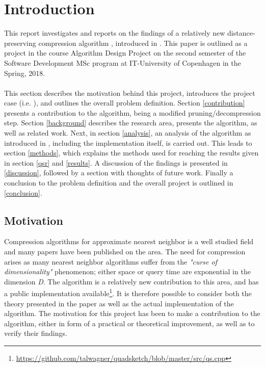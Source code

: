 \section{Introduction}
\label{introduction}
This report investigates and reports on the findings of a relatively new distance-preserving compression algorithm \qs{}, introduced in \cite{wagner17}. This paper is outlined as a project in the course Algorithm Design Project on the second semester of the Software Development MSc program at IT-University of Copenhagen in the Spring, 2018.
\\
\\
This section describes the motivation behind this project, introduces the project case (i.e. \qs{}), and outlines the overall problem definition. Section \ref{contribution} presents a contribution to the algorithm, being a modified pruning/decompression step. Section \ref{background} describes the research area, presents the \qs{} algorithm, as well as related work. Next, in section \ref{analysis}, an analysis of the algorithm as introduced in \cite{wagner17}, including the \qs{} implementation itself, is carried out. This leads to section \ref{methods}, which explains the methods used for reaching the results given in section \ref{qsr} and \ref{results}. A discussion of the findings is presented in \ref{discussion}, followed by a section with thoughts of future work. Finally a conclusion to the problem definition and the overall project is outlined in \ref{conclusion}.

\subsection{Motivation} %
Compression algorithms for approximate nearest neighbor is a well studied field and many papers have been published on the area. The need for compression arises as many nearest neighbor algorithms suffer from the \textit{"curse of dimensionality"} phenomenon; either space or query time are exponential in the dimension \textit{D}\cite{ilya15}. The \qs{} algorithm is a relatively new contribution to this area, and has a public implementation available\footnote{\url{https://github.com/talwagner/quadsketch/blob/master/src/qs.cpp}}. It is therefore possible to consider both the theory presented in the paper as well as the actual implementation of the algorithm. The motivation for this project has been to make a contribution to the algorithm, either in form of a practical or theoretical improvement, as well as to verify their findings.

